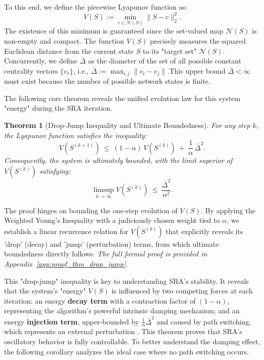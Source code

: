 \documentclass[journal]{IEEEtran}
\newtheorem{theorem}{Theorem}
\begin{document}
To this end, we define the piecewise Lyapunov function as:
\begin{equation}\label{eq:lyapunov_def}
V(S):=\min_{c\in\mathcal N(S)}\|S-c\|_2^2.
\end{equation}
The existence of this minimum is guaranteed since the set-valued map $\mathcal N(S)$ is non-empty and compact. The function $V(S)$ precisely measures the squared Euclidean distance from the current state $S$ to its "target set" $\mathcal N(S)$. Concurrently, we define $\bar{\Delta}$ as the diameter of the set of all possible constant centrality vectors $\{v_\ell\}$, i.e., $\bar{\Delta} := \max_{i,j} \|v_i - v_j\|$.This upper bound $\bar\Delta<\infty$ must exist because the number of possible network states is finite.

The following core theorem reveals the unified evolution law for this system "energy" during the SRA iteration.

\begin{theorem}[Drop-Jump Inequality and Ultimate Boundedness]
\label{thm:drop_jump}
 For any step $k$, the Lyapunov function satisfies the inequality:
 \begin{equation}\label{eq:drop_jump_one_step}
 V(S^{(k+1)})\ \le\ (1-\alpha)\,V(S^{(k)})\ +\ \dfrac{1}{\alpha}\,\bar\Delta^{2}.
 \end{equation}
 Consequently, the system is ultimately bounded, with the limit superior of $V(S^{(k)})$ satisfying:
\begin{equation}\label{eq:limsup_boundedness}
\limsup_{k\to\infty}V(S^{(k)})\ \le\ \frac{\bar\Delta^{2}}{\alpha^2}.
\end{equation}
\end{theorem}
\begin{IEEEproof}
The proof hinges on bounding the one-step evolution of $V(S)$. By applying the Weighted Young's Inequality with a judiciously chosen weight tied to $\alpha$, we establish a linear recurrence relation for $V(S^{(k)})$ that explicitly reveals its 'drop' (decay) and 'jump' (perturbation) terms, from which ultimate boundedness directly follows.
\textit{The full formal proof is provided in Appendix~\ref{app:proof_thm_drop_jump}.}
\end{IEEEproof}

This "drop-jump" inequality is key to understanding SRA's stability. It reveals that the system's "energy" $V(S)$ is influenced by two competing forces at each iteration: an energy \textbf{decay term} with a contraction factor of $(1-\alpha)$, representing the algorithm's powerful intrinsic damping mechanism; and an energy \textbf{injection term}, upper-bounded by $\frac{1}{\alpha}\bar\Delta^2$ and caused by path switching, which represents an external perturbation . This theorem proves that SRA's oscillatory behavior is fully controllable. To better understand the damping effect, the following corollary analyzes the ideal case where no path switching occurs.
\end{document}
